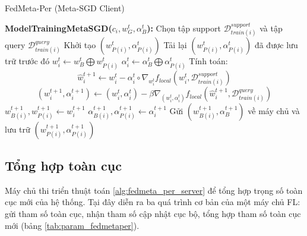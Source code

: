 \begin{algorithm}[H]
    \caption{FedMeta-Per (Meta-SGD Client)} \label{alg:fedsgd_per_client}
    \begin{algorithmic}[1]
        \State\textbf{ModelTrainingMetaSGD($c_i, w_G^t, \alpha_B^t$):}
        \State Chọn tập support $\mathcal{D}_{train(i)}^{support}$ và tập query $\mathcal{D}_{train(i)}^{query}$
            \State Khởi tạo $(w_{P(i)}^t, \alpha_{P(i)}^t)$
        \Else
            \State Tải lại $(w_{P(i)}^t, \alpha_{P(i)}^t)$ đã được lưu trữ trước đó
        \EndIf
        \State $w_i^t \gets w_B^t \bigoplus w_{P(i)}^t$ 
        \State $\alpha_i^t \gets \alpha_B^t \bigoplus \alpha_{P(i)}^t$ 
        \State Tính toán:
        \begin{dmath*}
            \hat{w}_{i}^{t+1} \gets w_{i}^t - \alpha_i^t\circ\nabla_{w_i^t} f_{local}(w_{i}^t, \mathcal{D}_{train(i)}^{support})
        \end{dmath*}
        \begin{dmath*}
            (w_{i}^{t+1}, \alpha_i^{t+1}) \gets (w_{i}^t, \alpha_{i}^{t}) - \beta\nabla_{(w_i^t, \alpha_i^t)} f_{local}(\hat{w}_{i}^{t+1}, \mathcal{D}_{train(i)}^{query})
        \end{dmath*}
        \State $w_{B(i)}^{t+1}, w_{P(i)}^{t+1} \gets w_i^{t+1}$ 
        \State $\alpha_{B(i)}^{t+1}, \alpha_{P(i)}^{t+1} \gets \alpha_i^{t+1}$ 
        \State Gửi $(w_{B(i)}^{t+1}, \alpha_B^{t+1})$ về máy chủ và lưu trữ $(w_{P(i)}^{t+1}, \alpha_{P(i)}^{t+1})$
    \end{algorithmic}
\end{algorithm}

\subsection{Tổng hợp toàn cục}

Máy chủ thi triển thuật toán \ref{alg:fedmeta_per_server} để tổng hợp trọng số toàn cục mới của hệ thống. Tại đây diễn ra ba quá trình cơ bản của một máy chủ FL: gửi tham số toàn cục, nhận tham số cập nhật cục bộ, tổng hợp tham số toàn cục mới (bảng \ref{tab:param_fedmetaper}).

